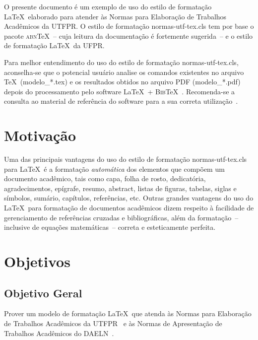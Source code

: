 \documentclass[oneside]{normas-utf-tex} %
\begin{document}
O presente documento \'e um exemplo de uso do estilo de formata\c{c}\~ao \LaTeX\ elaborado para atender \`as Normas para Elabora\c{c}\~ao de Trabalhos Acad\^emicos da UTFPR. O estilo de formata\c{c}\~ao {\ttfamily normas-utf-tex.cls} tem por base o pacote \textsc{abn}\TeX~-- cuja leitura da documenta\c{c}\~ao \cite{abnTeX2009} \'e fortemente sugerida~-- e o estilo de formata\c{c}\~ao \LaTeX\ da UFPR.

Para melhor entendimento do uso do estilo de formata\c{c}\~ao {\ttfamily normas-utf-tex.cls}, aconselha-se que o potencial usu\'ario analise os comandos existentes no arquivo \TeX\ ({\ttfamily modelo\_*.tex}) e os resultados obtidos no arquivo PDF ({\ttfamily modelo\_*.pdf}) depois do processamento pelo software \LaTeX\ + \textsc{Bib}\TeX~\cite{LaTeX2009,BibTeX2009}. Recomenda-se a consulta ao material de refer\^encia do software para a sua correta utiliza\c{c}\~ao~\cite{Lamport1986,Buerger1989,Kopka2003,Mittelbach2004}.

\section{Motiva\c{c}\~ao}

Uma das principais vantagens do uso do estilo de formata\c{c}\~ao {\ttfamily normas-utf-tex.cls} para \LaTeX\ \'e a formata\c{c}\~ao \textit{autom\'atica} dos elementos que comp\~oem um documento acad\^emico, tais como capa, folha de rosto, dedicat\'oria, agradecimentos, ep\'igrafe, resumo, abstract, listas de figuras, tabelas, siglas e s\'imbolos, sum\'ario, cap\'itulos, refer\^encias, etc. Outras grandes vantagens do uso do \LaTeX\ para formata\c{c}\~ao de documentos acad\^emicos dizem respeito \`a facilidade de gerenciamento de refer\^encias cruzadas e bibliogr\'aficas, al\'em da formata\c{c}\~ao~-- inclusive de equa\c{c}\~oes  matem\'aticas~-- correta e esteticamente perfeita.

\section{Objetivos}

\subsection{Objetivo Geral}

Prover um modelo de formata\c{c}\~ao \LaTeX\ que atenda \`as Normas para Elabora\c{c}\~ao de Trabalhos Acad\^emicos da UTFPR~\cite{UTFPR2008} e \`as Normas de Apresenta\c{c}\~ao de Trabalhos Acad\^emicos do DAELN~\cite{DAELN2006}.
\end{document}
